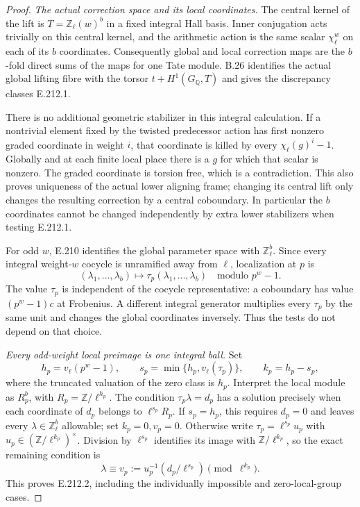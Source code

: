 \begin{proof}
\emph{The actual correction space and its local coordinates.}
The central kernel of the lift is
$T=\mathbb Z_\ell(w)^b$ in a fixed integral Hall basis.
Inner conjugation acts trivially on this central kernel, and
the arithmetic action is the same scalar $\chi_\ell^w$ on
each of its $b$ coordinates. Consequently global and local
correction maps are the $b$-fold direct sums of the maps for
one Tate module. B.26 identifies the actual global lifting
fibre with the torsor $t+H^1(G_{\mathbb Q},T)$ and gives
the discrepancy classes E.212.1.

There is no additional geometric stabilizer in this integral
calculation. If a nontrivial element fixed by the twisted
predecessor action has first nonzero graded coordinate in
weight $i$, that coordinate is killed by every
$\chi_\ell(g)^i-1$. Globally and at each finite local place
there is a $g$ for which that scalar is nonzero. The graded
coordinate is torsion free, which is a contradiction.
This also proves uniqueness of the actual lower aligning
frame; changing its central lift only changes the resulting
correction by a central coboundary. In particular the
$b$ coordinates cannot be changed independently by extra
lower stabilizers when testing E.212.1.

For odd $w$, E.210 identifies the global parameter space with
$\mathbb Z_\ell^b$. Since every integral weight-$w$ cocycle
is unramified away from $\ell$, localization at $p$ is
\[
 (\lambda_1,\ldots,\lambda_b)\longmapsto
      \tau_p(\lambda_1,\ldots,\lambda_b)
 \quad\text{modulo }p^w-1.
 \tag{E.212.4}
\]
The value $\tau_p$ is independent of the cocycle representative:
a coboundary has value $(p^w-1)c$ at Frobenius. A different
integral generator multiplies every $\tau_p$ by the same unit
and changes the global coordinates inversely. Thus the tests
do not depend on that choice.

\emph{Every odd-weight local preimage is one integral ball.}
Set
\[
 h_p=v_\ell(p^w-1),\qquad
 s_p=\min\{h_p,v_\ell(\tau_p)\},\qquad k_p=h_p-s_p,
 \tag{E.212.5}
\]
where the truncated valuation of the zero class is $h_p$.
Interpret the local module as $R_p^b$, with
$R_p=\mathbb Z/\ell^{h_p}$. The condition
$\tau_p\lambda=d_p$ has a solution precisely when each
coordinate of $d_p$ belongs to $\ell^{s_p}R_p$.
If $s_p=h_p$, this requires $d_p=0$ and leaves every
$\lambda\in\mathbb Z_\ell^b$ allowable; set $k_p=0,v_p=0$.
Otherwise write $\tau_p=\ell^{s_p}u_p$ with
$u_p\in(\mathbb Z/\ell^{k_p})^\times$. Division by
$\ell^{s_p}$ identifies its image with
$\mathbb Z/\ell^{k_p}$, so the exact remaining condition is
\[
 \lambda\equiv
 v_p:=u_p^{-1}(d_p/\ell^{s_p})\pmod{\ell^{k_p}}.
 \tag{E.212.6}
\]
This proves E.212.2, including the individually impossible
and zero-local-group cases.


\end{proof}
